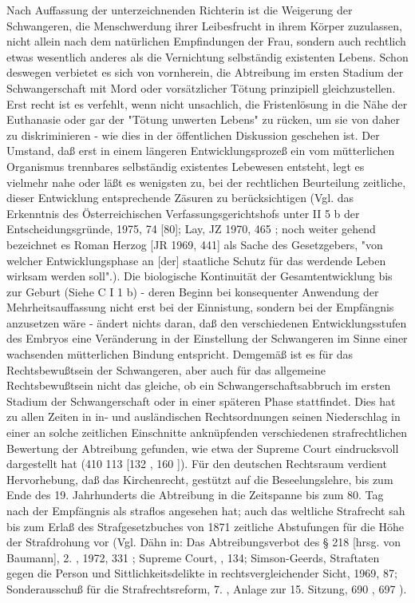 \documentclass[12pt]{article}
\begin{document}
\syncleft
\begin{sourcepara}
Nach Auffassung der unterzeichnenden Richterin ist die Weigerung der Schwangeren, die Menschwerdung ihrer Leibesfrucht in ihrem Körper zuzulassen, nicht allein nach dem natürlichen Empfindungen der Frau, sondern auch rechtlich etwas wesentlich anderes als die Vernichtung selbständig existenten Lebens. Schon deswegen verbietet es sich von vornherein, die Abtreibung im ersten Stadium der Schwangerschaft mit Mord oder vorsätzlicher Tötung prinzipiell gleichzustellen. Erst recht ist es verfehlt, wenn nicht unsachlich, die Fristenlösung in die Nähe der Euthanasie oder gar der "Tötung unwerten Lebens" zu rücken, um sie von daher zu diskriminieren - wie dies in der öffentlichen Diskussion geschehen ist. Der Umstand, daß erst in einem längeren Entwicklungsprozeß ein vom mütterlichen Organismus trennbares selbständig existentes Lebewesen entsteht, legt es vielmehr nahe oder läßt es wenigsten zu, bei der rechtlichen Beurteilung zeitliche, dieser Entwicklung entsprechende Zäsuren zu berücksichtigen (Vgl. das Erkenntnis des Österreichischen Verfassungsgerichtshofs unter II 5 b der Entscheidungsgründe, \abbrEuGRZ{} 1975, \abbrS{} 74 [80]; Lay, JZ 1970, \abbrS{} 465 \abbrFF{}; noch weiter gehend bezeichnet es Roman Herzog [JR 1969, \abbrS{} 441] als Sache des Gesetzgebers, "von welcher Entwicklungsphase an [der] staatliche Schutz für das werdende Leben wirksam werden soll".). Die biologische Kontinuität der Gesamtentwicklung bis zur Geburt (Siehe C I 1 b) - deren Beginn bei konsequenter Anwendung der Mehrheitsauffassung nicht erst bei der Einnistung, sondern bei der Empfängnis anzusetzen wäre - ändert nichts daran, daß den verschiedenen Entwicklungsstufen des Embryos eine Veränderung in der Einstellung der Schwangeren im Sinne einer wachsenden mütterlichen Bindung entspricht. Demgemäß ist es für das Rechtsbewußtsein der Schwangeren, aber auch für das allgemeine Rechtsbewußtsein nicht das gleiche, ob ein Schwangerschaftsabbruch im ersten Stadium der Schwangerschaft oder in einer späteren Phase stattfindet. Dies hat zu allen Zeiten in in- und ausländischen Rechtsordnungen seinen Niederschlag in einer an solche zeitlichen Einschnitte anknüpfenden verschiedenen strafrechtlichen Bewertung der Abtreibung gefunden, wie etwa der Supreme Court eindrucksvoll dargestellt hat (410 \abbrUS{} 113 [132 \abbrFF{}, 160 \abbrF{}]). Für den deutschen Rechtsraum verdient Hervorhebung, daß das Kirchenrecht, gestützt auf die Beseelungslehre, bis zum Ende des 19. Jahrhunderts die Abtreibung in die Zeitspanne bis zum 80. Tag nach der Empfängnis als straflos angesehen hat; auch das weltliche Strafrecht sah bis zum Erlaß des Strafgesetzbuches von 1871 zeitliche Abstufungen für die Höhe der Strafdrohung vor (Vgl. Dähn in: Das Abtreibungsverbot des § 218 \abbrStGB{} [hrsg. von Baumann], 2. \abbrAufl{}, 1972, \abbrS{} 331 \abbrF{}; Supreme Court, \abbrAAO{}, 134; Simson-Geerds, Straftaten gegen die Person und Sittlichkeitsdelikte in rechtsvergleichender Sicht, 1969, \abbrS{} 87; Sonderausschuß für die Strafrechtsreform, 7. \abbrWp{}, Anlage zur 15. Sitzung, \abbrStenBer{} \abbrS{} 690 \abbrFF{}, 697 \abbrF{}).
\end{sourcepara}
\end{document}
